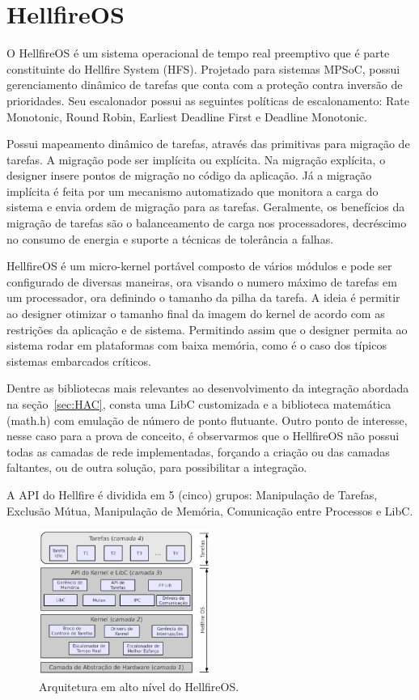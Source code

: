 \section{HellfireOS}
\label{sec:HellfireOS}
O HellfireOS é um sistema operacional de tempo real preemptivo que é parte constituinte
do Hellfire System (HFS). Projetado para sistemas MPSoC, possui gerenciamento
dinâmico de tarefas que conta com a proteção contra inversão de prioridades. Seu escalonador
possui as seguintes políticas de escalonamento: Rate Monotonic, Round Robin, Earliest Deadline First e
Deadline Monotonic.

Possui mapeamento dinâmico de tarefas, através das primitivas para migração de tarefas. A migração pode
ser implícita ou explícita. Na migração explícita, o designer insere pontos de migração no código
da aplicação. Já a migração implícita é feita por um mecanismo automatizado que monitora a carga do
sistema e envia ordem de migração para as tarefas. Geralmente, os benefícios da migração de tarefas são
o balanceamento de carga nos processadores, decréscimo no consumo de energia e suporte a técnicas de
tolerância a falhas.

HellfireOS é um micro-kernel portável composto de vários módulos e pode ser configurado de diversas maneiras,
ora visando o numero máximo de tarefas em um processador, ora definindo o tamanho da pilha da tarefa.
A ideia é permitir ao designer otimizar o tamanho final da imagem do kernel de acordo com as restrições
da aplicação e de sistema. Permitindo assim que o designer permita ao sistema rodar em plataformas com
baixa memória, como é o caso dos típicos sistemas embarcados críticos.

Dentre as bibliotecas mais relevantes ao desenvolvimento da integração abordada na seção~\ref{sec:HAC},
consta uma LibC customizada e a biblioteca matemática (math.h) com emulação de número de ponto
flutuante. Outro ponto de interesse, nesse caso para a prova de conceito, é observarmos
que o HellfireOS não possui todas as camadas de rede implementadas, forçando a criação
ou das camadas faltantes, ou de outra solução, para possibilitar a integração.

A API do Hellfire é dividida em 5 (cinco) grupos: Manipulação de Tarefas, Exclusão Mútua,
Manipulação de Memória, Comunicação entre Processos e LibC.

\begin{figure}[H]
	\centering
		\includegraphics[width=0.5\textwidth]{fig/HellfireArch.png}
	\caption{Arquitetura em alto nível do HellfireOS.}
\end{figure}

